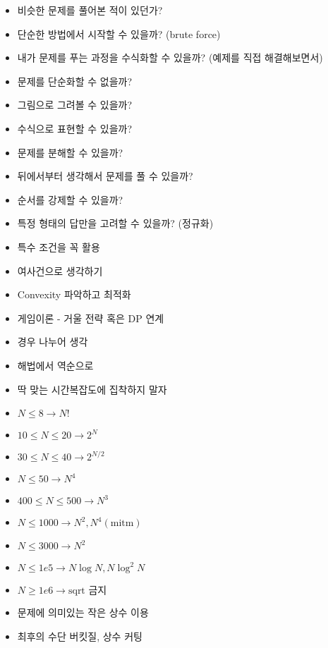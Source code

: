 \documentclass[landscape, 10pt, a4paper, oneside, twocolumn]{extarticle}
\begin{document}

\begin{itemize}
\item 비슷한 문제를 풀어본 적이 있던가?
\item 단순한 방법에서 시작할 수 있을까? (brute force)
\item 내가 문제를 푸는 과정을 수식화할 수 있을까? (예제를 직접 해결해보면서)
\item 문제를 단순화할 수 없을까?
\item 그림으로 그려볼 수 있을까?
\item 수식으로 표현할 수 있을까?
\item 문제를 분해할 수 있을까?
\item 뒤에서부터 생각해서 문제를 풀 수 있을까?
\item 순서를 강제할 수 있을까?
\item 특정 형태의 답만을 고려할 수 있을까? (정규화)
\end{itemize}

\begin{itemize}
\item 특수 조건을 꼭 활용
\item 여사건으로 생각하기
\item Convexity 파악하고 최적화
\item 게임이론 - 거울 전략 혹은 DP 연계
\item 경우 나누어 생각
\item 해법에서 역순으로
\item 딱 맞는 시간복잡도에 집착하지 말자
\end{itemize}

\begin{itemize}
    \item $N \le 8 \rightarrow N!$
    \item $10 \le N \le 20 \rightarrow 2^N$
    \item $30 \le N \le 40 \rightarrow 2^{N/2}$
    \item $N \le 50 \rightarrow N^4$
    \item $400 \le N \le 500 \rightarrow N^3$
    \item $N \le 1000 \rightarrow N^2, N^4 (\text{mitm})$
    \item $N \le 3000 \rightarrow N^2$
    \item $N \le 1e5 \rightarrow N\log{N}, N\log^2{N}$
    \item $N \ge 1e6 \rightarrow \text{sqrt 금지}$
    \item 문제에 의미있는 작은 상수 이용
    \item 최후의 수단 버킷질, 상수 커팅
\end{itemize}
\end{document}
